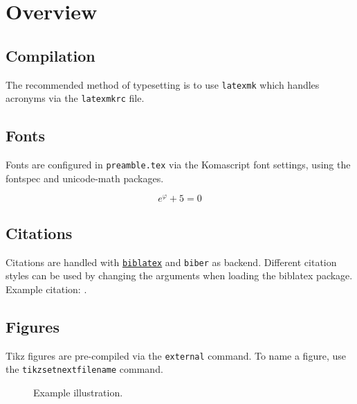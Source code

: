 
\chapter{Overview}

\section{Compilation}

The recommended method of typesetting is to use \texttt{latexmk} which handles acronyms via the \texttt{latexmkrc} file.

\section{Fonts}

Fonts are configured in \texttt{preamble.tex} via the Komascript font settings, using the fontspec and unicode-math packages.

\begin{equation}
	e^\varphi + 5 = 0
\end{equation}

\section{Citations}

Citations are handled with \href{https://www.ctan.org/pkg/biblatex}{\texttt{biblatex}} and \texttt{biber} as backend. Different citation styles can be used by changing the arguments when loading the biblatex package. Example citation: \citet{Shannon:1949ti}.

\section{Figures}

Tikz figures are pre-compiled via the \texttt{external} command. To name a figure, use the \texttt{tikzsetnextfilename} command.

\begin{figure}[ht]
	\begin{center}
	\end{center}
	\caption{Example illustration.}
\end{figure}

